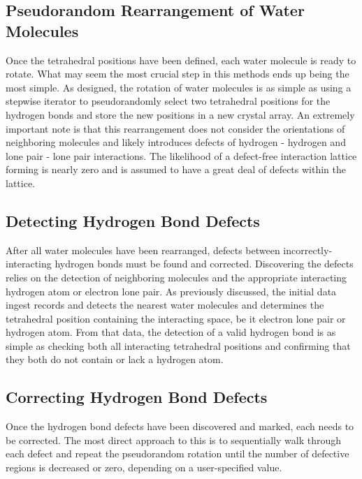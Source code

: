 \subsection{Pseudorandom Rearrangement of Water Molecules}

Once the tetrahedral positions have been defined, each water molecule is ready to rotate.
What may seem the most crucial step in this methods ends up being the most simple.
As designed, the rotation of water molecules is as simple as using a stepwise iterator to pseudorandomly select two tetrahedral positions for the hydrogen bonds and store the new positions in a new crystal array.
An extremely important note is that this rearrangement does not consider the orientations of neighboring molecules and likely introduces defects of hydrogen - hydrogen and lone pair - lone pair interactions.
The likelihood of a defect-free interaction lattice forming is nearly zero and is assumed to have a great deal of defects within the lattice. 


\subsection{Detecting Hydrogen Bond Defects}

After all water molecules have been rearranged, defects between incorrectly-interacting hydrogen bonds must be found and corrected.
Discovering the defects relies on the detection of neighboring molecules and the appropriate interacting hydrogen atom or electron lone pair. 
As previously discussed, the initial data ingest records and detects the nearest water molecules and determines the tetrahedral position containing the interacting space, be it electron lone pair or hydrogen atom. 
From that data, the detection of a valid hydrogen bond is as simple as checking both all interacting tetrahedral positions and confirming that they both do not contain or lack a hydrogen atom.


\subsection{Correcting Hydrogen Bond Defects}

Once the hydrogen bond defects have been discovered and marked, each needs to be corrected.
The most direct approach to this is to sequentially walk through each defect and repeat the pseudorandom rotation until the number of defective regions is decreased or zero, depending on a user-specified value.


